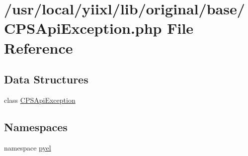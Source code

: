 \hypertarget{CPSApiException_8php}{
\section{/usr/local/yiixl/lib/original/base/CPSApiException.php File Reference}
\label{CPSApiException_8php}
}
\subsection*{Data Structures}
\begin{DoxyCompactItemize}
\item 
class \hyperlink{classCPSApiException}{CPSApiException}
\end{DoxyCompactItemize}
\subsection*{Namespaces}
\begin{DoxyCompactItemize}
\item 
namespace \hyperlink{namespacepyel}{pyel}
\end{DoxyCompactItemize}
